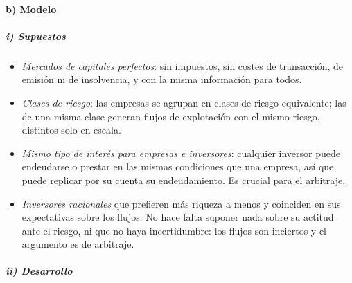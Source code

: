 \documentclass[11pt]{article}
\begin{document}
\paragraph{b) Modelo}

\subparagraph{i) Supuestos}

\begin{itemize}
\item \emph{Mercados de capitales perfectos}: sin impuestos, sin costes de transacción, de emisión ni de insolvencia, y con la misma información para todos.
\item \emph{Clases de riesgo}: las empresas se agrupan en clases de riesgo equivalente; las de una misma clase generan flujos de explotación con el mismo riesgo, distintos solo en escala.
\item \emph{Mismo tipo de interés para empresas e inversores}: cualquier inversor puede endeudarse o prestar en las mismas condiciones que una empresa, así que puede replicar por su cuenta su endeudamiento. Es crucial para el arbitraje.
\item \emph{Inversores racionales} que prefieren más riqueza a menos y coinciden en sus expectativas sobre los flujos. No hace falta suponer nada sobre su actitud ante el riesgo, ni que no haya incertidumbre: los flujos son inciertos y el argumento es de arbitraje.
\end{itemize}

\subparagraph{ii) Desarrollo}
\end{document}
